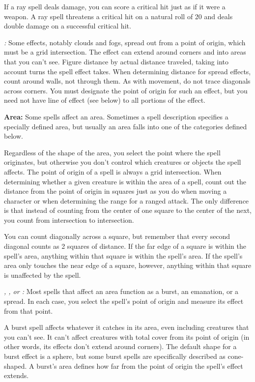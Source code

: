If a ray spell deals damage, you can score a critical hit just as if it were a 
weapon. A ray spell threatens a critical hit on a natural roll of 20 and deals 
double damage on a successful critical hit.

\textit{:} Some effects, notably clouds and fogs, spread out from a point 
of origin, which must be a grid intersection. The effect can extend around corners 
and into areas that you can't see. Figure distance by actual distance traveled, 
taking into account turns the spell effect takes. When determining distance for 
spread effects, count around walls, not through them. As with movement, do not 
trace diagonals across corners. You must designate the point of origin for such 
an effect, but you need not have line of effect (see below) to all portions of 
the effect.

\textbf{Area:} Some spells affect an area. Sometimes a spell description specifies 
a specially defined area, but usually an area falls into one of the categories 
defined below.

Regardless of the shape of the area, you select the point where the spell originates, 
but otherwise you don't control which creatures or objects the spell affects. The 
point of origin of a spell is always a grid intersection. When determining whether 
a given creature is within the area of a spell, count out the distance from the 
point of origin in squares just as you do when moving a character or when determining 
the range for a ranged attack. The only difference is that instead of counting 
from the center of one square to the center of the next, you count from intersection 
to intersection.

You can count diagonally across a square, but remember that every second diagonal 
counts as 2 squares of distance. If the far edge of a square is within the spell's 
area, anything within that square is within the spell's area. If the spell's area 
only touches the near edge of a square, however, anything within that square is 
unaffected by the spell.

\textit{, , or :} Most spells that affect an area function 
as a burst, an emanation, or a spread. In each case, you select the spell's point 
of origin and measure its effect from that point.

A burst spell affects whatever it catches in its area, even including creatures 
that you can't see. It can't affect creatures with total cover from its point of 
origin (in other words, its effects don't extend around corners). The default shape 
for a burst effect is a sphere, but some burst spells are specifically described 
as cone-shaped. A burst's area defines how far from the point of origin the spell's 
effect extends.

